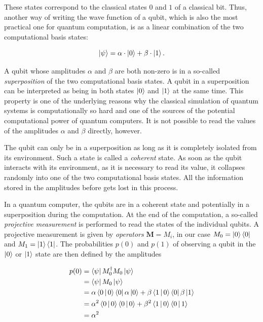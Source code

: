These states correspond to the classical states $0$ and $1$ of a classical bit. Thus, another way of writing the wave
function of a qubit, which is also the most practical one for quantum computation, is as a linear combination of the
two computational basis states:

\begin{equation}
  \Ket{\psi} = \alpha \cdot \Ket{0} + \beta \cdot \Ket{1}.
\end{equation}

A qubit whose amplitudes $\alpha$ and $\beta$ are both non-zero is in a so-called \textit{superposition} of the two
computational basis states. A qubit in a superposition can be interpreted as being in both states $\Ket{0}$ and $\Ket{1}$ at the same time.
This property is one of the underlying reasons why the classical simulation of
quantum systems is computationally so hard and one of the sources of the potential computational power of quantum computers.
It is not possible to read the values of the amplitudes $\alpha$ and $\beta$
directly, however.

The qubit can only be in a superposition as long as it is completely isolated
from its environment. Such a state is called a \textit{coherent} state. As
soon as the qubit interacts with its environment, as it is necessary to read
its value, it collapses randomly into one of the two computational basis
states. All the information stored in the amplitudes before gets lost in this process.

In a quantum computer, the qubits are in a coherent state and potentially in a superposition during the computation. At the end of the computation, a so-called
\textit{projective measurement} is performed to read the states of the individual qubits. A projective measurement is given
by \textit{operators} $\textbf{M} = {M_i}$, in our case $M_0 = \Ket{0}\Bra{0}$ and $M_1 = \Ket{1}\Bra{1}$. The probabilities $p(0)$ and $p(1)$ of observing a qubit in the $\Ket{0}$ or
$\Ket{1}$ state are then defined by the amplitudes

\begin{align}
  p(0) &= \Bra{\psi} M_0^{\dagger}M_0 \Ket{\psi} \\
       &=  \Bra{\psi} M_0 \Ket{\psi} \\
       &= \alpha \Braket{0|0} \Bra{0} \alpha \Ket{0} + \beta \Braket{1|0} \Bra{0} \beta \Ket{1} \\
       &= \alpha^2 \Braket{0|0} \Braket{0|0} + \beta^2 \Braket{1|0} \Braket{0|1} \\
       &= \alpha^2
\end{align}

